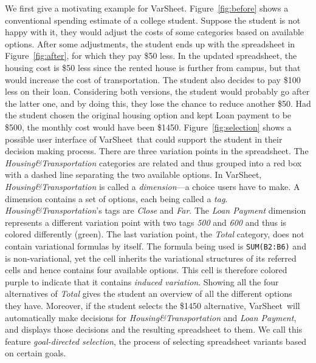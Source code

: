\documentclass[conference]{IEEEtran}
\newcommand{\prog}[1]{{\small\texttt{#1}}}
\newcommand{\varsheet}{VarSheet}
\newcommand{\gds}{goal-directed selection}
\newcommand{\mapname}[1]{\textit{#1}}
\newcommand{\htdim}{Housing\&Transportation}
\newcommand{\lpdim}{Loan Payment}
\begin{document}
We first give a motivating example for \varsheet.
Figure~\ref{fig:before} shows a conventional spending estimate of a
college student. Suppose the student is not happy with it, they would
adjust the costs of some categories based on available options. After
some adjustments, the student ends up with the spreadsheet in
Figure~\ref{fig:after}, for which they pay \$50 less. In the updated
spreadsheet, the housing cost is \$50 less since the rented house is
further from campus, but that would increase the cost of transportation.
The student also decides to pay \$100 less on their loan. Considering
both versions, the student would probably go after the latter one, and
by doing this, they lose the chance to reduce another \$50. Had the
student chosen the original housing option and kept Loan payment to be
\$500, the monthly cost would have been \$1450.
%
Figure~\ref{fig:selection} shows a possible user interface of
\varsheet~that could support the student in their decision making
process. There are three variation points in the spreadsheet. The
\mapname{\htdim} categories are related and thus grouped into a red box
with a dashed line separating the two available options. In \varsheet,
\mapname{\htdim} is called a \emph{dimension}---a choice users have to
make. A dimension contains a set of options, each being called a
\emph{tag}. \mapname{\htdim}'s tags are \mapname{Close} and
\mapname{Far}. The \mapname{\lpdim} dimension represents a different
variation point with two tags \mapname{500} and \mapname{600} and thus
is colored differently (green). The last variation point, the
\mapname{Total} category, does not contain variational formulas by
itself. The formula being used is \prog{SUM(B2:B6)} and is
non-variational, yet the cell inherits the variational structures of its
referred cells and hence contains four available options. This cell is
therefore colored purple to indicate that it contains \emph{induced
variation}. Showing all the four alternatives of \mapname{Total} gives
the student an overview of all the different options they have.
Moreover, if the student selects the \$1450 alternative, \varsheet~will
automatically make decisions for \mapname{\htdim} and \mapname{\lpdim},
and displays those decisions and the resulting spreadsheet to them. We
call this feature \emph{\gds}, the process of selecting spreadsheet
variants based on certain goals.
\end{document}
